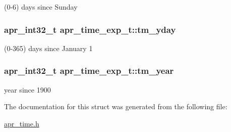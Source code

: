 (0-\/6) days since Sunday \hypertarget{structapr__time__exp__t_aa15c7ab0d7e2a974e89cc1470f1583ab}{
\subsubsection[{tm\-\_\-yday}]{\setlength{\rightskip}{0pt plus 5cm}apr\-\_\-int32\-\_\-t apr\-\_\-time\-\_\-exp\-\_\-t\-::tm\-\_\-yday}}\label{structapr__time__exp__t_aa15c7ab0d7e2a974e89cc1470f1583ab}
(0-\/365) days since January 1 \hypertarget{structapr__time__exp__t_a35c32245be49279a6689e34bcd6e534a}{
\subsubsection[{tm\-\_\-year}]{\setlength{\rightskip}{0pt plus 5cm}apr\-\_\-int32\-\_\-t apr\-\_\-time\-\_\-exp\-\_\-t\-::tm\-\_\-year}}\label{structapr__time__exp__t_a35c32245be49279a6689e34bcd6e534a}
year since 1900 

The documentation for this struct was generated from the following file\-:\begin{DoxyCompactItemize}
\item 
\hyperlink{apr__time_8h}{apr\-\_\-time.\-h}\end{DoxyCompactItemize}
